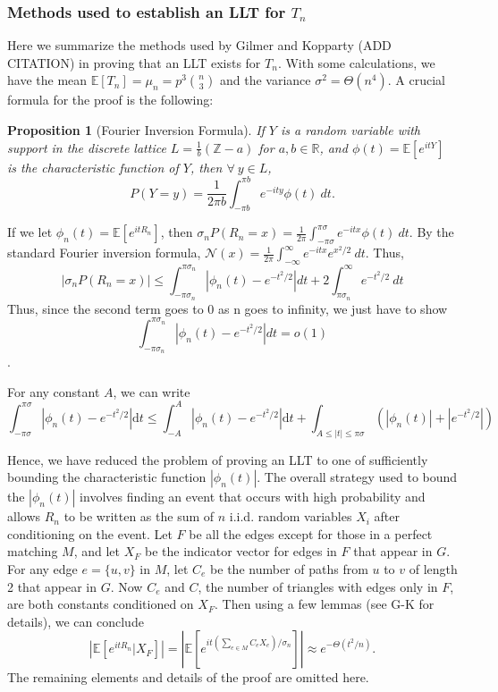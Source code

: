 \documentclass[12pt]{article} %
\newcommand{\abs}[1]{\left\lvert#1\right\rvert}
\newcommand{\E}{\mathbb{E}}
\newcommand{\bbr}{\mathbb{R}}
\newcommand{\Z}{\mathbb{Z}}
\renewcommand{\d}{\mathrm{d}}
\newtheorem{prop}[thm]{Proposition}
\theoremstyle{definition}
\theoremstyle{remark}
\begin{document}
\subsubsection{Methods used to establish an LLT for $T_n$}
Here we summarize the methods used by Gilmer and Kopparty (ADD CITATION) in proving that an LLT exists for $T_n$.
With some calculations, we have the mean $\E[T_n] = \mu_n = p^3{n\choose3}$ and the variance $\sigma^2 = \Theta(n^4).$ 
A crucial formula for the proof is the following:
\begin{prop}[Fourier Inversion Formula]
If $Y$ is a random variable with support in the discrete lattice $L = \frac{1}{b}(\Z - a)$ for $a,b \in \bbr$, and $\phi(t) = \E[e^{itY}]$ is the characteristic function of $Y$, then $\forall \ y \in L$, 
\[ P(Y = y) = \frac{1}{2\pi b} \int_{-\pi b}^{\pi b} e^{-ity}\phi(t)\ dt.
\]
\end{prop}

If we let $\phi_n(t) = \E[e^{itR_n}]$, then 
$\sigma_n P(R_n = x) = \frac{1}{2\pi} \int_{-\pi\sigma}^{\pi\sigma} e^{-itx}\phi(t)\ dt.$
By the standard Fourier inversion formula,
$\mathcal{N}(x) = \frac{1}{2\pi} \int_{-\infty}^{\infty} e^{-itx}e^{x^2/2}\ dt.$ Thus, 
\[ \abs{\sigma_n P(R_n = x)} \leq \int_{-\pi\sigma_n}^{\pi\sigma_n} \abs{\phi_n(t) - e^{-t^2/2}} dt + 2 \int_{\pi\sigma_n}^{\infty} e^{-t^2/2}\ dt
\]
Thus, since the second term goes to 0 as n goes to infinity, we just have to show \[\int_{-\pi\sigma_n}^{\pi\sigma_n} \abs{\phi_n(t) - e^{-t^2/2}} dt = o(1)\].

For any constant $A$, we can write
	\[
		\int_{-\pi \sigma}^{\pi \sigma} \abs{\phi_n(t) - e^{-t^2/2}} \d t
		\leq \int_{-A}^{A} \abs{\phi_n(t) - e^{-t^2/2}} \d t
		+ \int_{A \leq \abs{t} \leq \pi \sigma} (\abs{\phi_n(t)} + |e^{-t^2/2}|)
\]

Hence, we have reduced the problem of proving an LLT to one of sufficiently bounding the characteristic function $\abs{\phi_n(t)}$. 
The overall strategy used to bound the $\abs{\phi_n(t)}$ involves finding an event that occurs with high probability and allows $R_n$ to be written as the sum of $n$ i.i.d. random variables $X_i$ after conditioning on the event. Let $F$ be all the edges except for those in a perfect matching $M$, and let $X_F$ be the indicator vector for edges in $F$ that appear in $G$. For any edge $e = \{u,v\}$ in $M$, let $C_e$ be the number of paths from $u$ to $v$ of length 2 that appear in $G$. Now $C_e$ and $C$, the number of triangles with edges only in $F$, are both constants conditioned on $X_F$. Then using a few lemmas (see G-K for details), we can conclude 
\[ \abs{\E[e^{itR_n} | X_F]} = \abs{\E[e^{it(\sum_{e\in M} C_e X_e)/\sigma_n}]} \approx e^{-\Theta(t^2/n)}.
\] The remaining elements and details of the proof are omitted here.  
\end{document}
